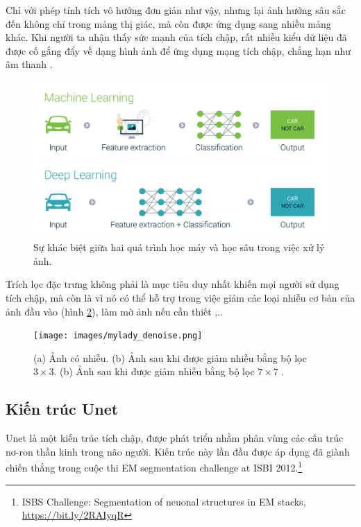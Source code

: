 \documentclass[a4paper, 12pt]{report}
\begin{document}
Chỉ với phép tính tích vô hướng đơn giản như vậy, nhưng lại ảnh hưởng sâu sắc đến không chỉ trong mảng thị giác, mà còn được ứng dụng sang nhiều mảng khác.
Khi người ta nhận thấy sức mạnh của tích chập, rất nhiều kiểu dữ liệu đã được cố gắng đẩy về dạng hình ảnh để ứng dụng mạng tích chập, chẳng hạn như âm thanh \cite{soundusingcnnieee, papiasoundcnn2021}.

\begin{figure}[!h]
\captionsetup{width=0.8\textwidth}
\centering
\includegraphics[width=15cm]{images/mlvsdlindip.jpg}
\caption{Sự khác biệt giữa hai quá trình học máy và học sâu trong việc xử lý ảnh.}
\label{fig:mlvsdlindip}
\end{figure}

Trích lọc đặc trưng không phải là mục tiêu duy nhất khiến mọi người sử dụng tích chập, mà còn là vì nó có thể hỗ trợ trong việc giảm các loại nhiễu cơ bản của ảnh đầu vào \cite{fu2018convolutional} (hình \ref{fig:mylady_denoise}), làm mờ ảnh nếu cần thiết \cite{szandala2020convolutional},..

\begin{figure}[!h]
\captionsetup{width=0.8\textwidth}
\centering
\texttt{[image: images/mylady\_denoise.png]}
\caption{(a) Ảnh có nhiễu. (b) Ảnh sau khi được giảm nhiễu bằng bộ lọc $3 \times 3$. (b) Ảnh sau khi được giảm nhiễu bằng bộ lọc $7 \times 7$ \cite{mlcobancnn2018}.}
\label{fig:mylady_denoise}
\end{figure}

\subsection{Kiến trúc Unet}

Unet là một kiến trúc tích chập, được phát triển nhằm phân vùng các cấu trúc nơ-ron thần kinh trong não người.
Kiến trúc này lần đầu được áp dụng đã giành chiến thắng trong cuộc thi EM segmentation challenge at ISBI 2012.\footnote{ISBS Challenge: Segmentation of neuonal structures in EM stacks, \href{https://bit.ly/2RAIyqR}{https://bit.ly/2RAIyqR}}\vspace{5pt}
\end{document}
